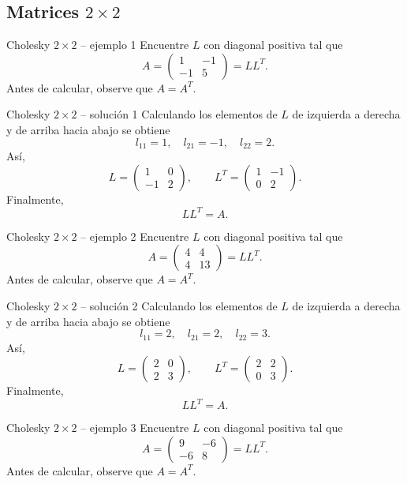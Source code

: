 \documentclass[aspectratio=169,10pt]{beamer}
\begin{document}
\subsection{Matrices $2\times 2$}
\begin{frame}{Cholesky $2\times 2$ -- ejemplo 1}
\small
Encuentre $L$ con diagonal positiva tal que
\[
A=\begin{pmatrix}1 & -1\\-1 & 5\end{pmatrix}=LL^T.
\]
Antes de calcular, observe que $A=A^T$.
\end{frame}
\begin{frame}{Cholesky $2\times 2$ -- solución 1}
\small
Calculando los elementos de $L$ de izquierda a derecha y de arriba hacia abajo se obtiene
\[
l_{11}=1,\quad l_{21}=-1,\quad l_{22}=2.
\]
Así,
\[
L=\begin{pmatrix}1 & 0\\-1 & 2\end{pmatrix},\qquad L^T=\begin{pmatrix}1 & -1\\0 & 2\end{pmatrix}.
\]
Finalmente,
\[
\boxed{LL^T=A}.
\]
\end{frame}
\begin{frame}{Cholesky $2\times 2$ -- ejemplo 2}
\small
Encuentre $L$ con diagonal positiva tal que
\[
A=\begin{pmatrix}4 & 4\\4 & 13\end{pmatrix}=LL^T.
\]
Antes de calcular, observe que $A=A^T$.
\end{frame}
\begin{frame}{Cholesky $2\times 2$ -- solución 2}
\small
Calculando los elementos de $L$ de izquierda a derecha y de arriba hacia abajo se obtiene
\[
l_{11}=2,\quad l_{21}=2,\quad l_{22}=3.
\]
Así,
\[
L=\begin{pmatrix}2 & 0\\2 & 3\end{pmatrix},\qquad L^T=\begin{pmatrix}2 & 2\\0 & 3\end{pmatrix}.
\]
Finalmente,
\[
\boxed{LL^T=A}.
\]
\end{frame}
\begin{frame}{Cholesky $2\times 2$ -- ejemplo 3}
\small
Encuentre $L$ con diagonal positiva tal que
\[
A=\begin{pmatrix}9 & -6\\-6 & 8\end{pmatrix}=LL^T.
\]
Antes de calcular, observe que $A=A^T$.
\end{frame}
\end{document}
